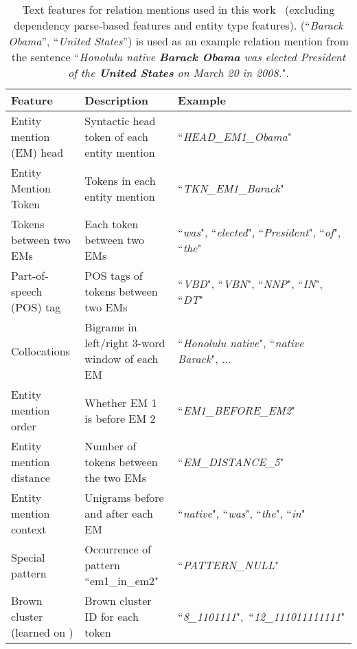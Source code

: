 \documentclass[letterpaper]{sig-alternate-2013}
\begin{document}
\begin{table}[t]
\vspace{-0.3cm}
\begin{center}
\hspace*{-0.6cm}
\begin{tiny}
\begin{tabularx}{1.1\linewidth}{lll}
\hline
\textbf{Feature} & \textbf{Description} & \textbf{Example} \\
\hline
Entity mention (EM) head & Syntactic head token of each entity mention & ``\textit{HEAD\_EM1\_Obama}"\\ Entity Mention Token & Tokens in each entity mention & ``\textit{TKN\_EM1\_Barack}"\\ Tokens between two EMs & Each token between two EMs & ``\textit{was}", ``\textit{elected}", ``\textit{President}", ``\textit{of}", ``\textit{the}"
\\
Part-of-speech (POS) tag & POS tags of tokens between two EMs & ``\textit{VBD}", ``\textit{VBN}", ``\textit{NNP}", ``\textit{IN}", ``\textit{DT}" \\ Collocations & Bigrams in left/right 3-word window of each EM & ``\textit{Honolulu native}", ``\textit{native Barack}", ... 
\\ Entity mention order & Whether EM 1 is before EM 2 & ``\textit{EM1\_BEFORE\_EM2}"\\ Entity mention distance & Number of tokens between the two EMs & ``\textit{EM\_DISTANCE\_5}" \\ Entity mention context & Unigrams before and after each EM & ``\textit{native}", ``\textit{was}", ``\textit{the}", ``\textit{in}" \\ Special pattern & Occurrence of pattern ``em1\_in\_em2" & ``\textit{PATTERN\_NULL}" \\ Brown cluster (learned on ) & Brown cluster ID for each token  & ``\textit{8\_1101111}",~``\textit{12\_111011111111}" \\ \hline
\end{tabularx}
\end{tiny}
\caption{\scriptsize Text features for relation mentions used in this work~\cite{guodong2005exploring,riedel2010modeling} (excluding dependency parse-based features and entity type features). (``\textit{Barack Obama}'', ``\textit{United States}'') is used as an example relation mention from the sentence ``\textit{Honolulu native \textbf{Barack Obama} was elected President of the \textbf{United States} on March 20 in 2008.}".}
\label{table:features}
\end{center}
\end{table}
\end{document}
